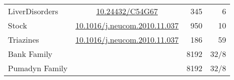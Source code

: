 \begin{tabular}{lcrr}
	LiverDisorders          & \href{https://doi.org/10.24432/C54G67}{10.24432/C54G67}                           & 345           & 6                \\
	Stock                   & \href{https://doi.org/10.1016/j.neucom.2010.11.037}{10.1016/j.neucom.2010.11.037} & 950           & 10               \\
	\addlinespace
	Triazines               & \href{https://doi.org/10.1016/j.neucom.2010.11.037}{10.1016/j.neucom.2010.11.037} & 186           & 59               \\
	\addlinespace
	Bank Family\tnote{a}    &                                                                                   & 8192          & 32/8             \\
	Pumadyn Family\tnote{a} &                                                                                   & 8192          & 32/8             \\\bottomrule
\end{tabular}
